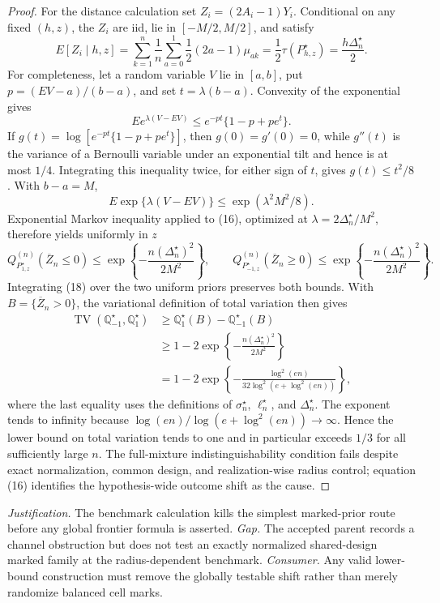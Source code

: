 \documentclass{article}
\begin{document}
\begin{proof}
For the distance calculation set \(Z_i=(2A_i-1)Y_i\).  Conditional on any fixed \((h,z)\), the \(Z_i\) are iid, lie in \([-M/2,M/2]\), and satisfy
\[
 E[Z_i\mid h,z]
 =\sum_{k=1}^n\frac1n\sum_{a=0}^1\frac12(2a-1)\mu_{ak}
 =\frac12\tau(P_{h,z}^\star)
 =\frac{h\Delta_n^\star}{2}. \tag{16}
\]
For completeness, let a random variable \(V\) lie in \([a,b]\), put \(p=(EV-a)/(b-a)\), and set \(t=\lambda(b-a)\).  Convexity of the exponential gives
\[
 E e^{\lambda(V-EV)}
 \leq e^{-pt}\{1-p+pe^t\}.
\]
If \(g(t)=\log[e^{-pt}\{1-p+pe^t\}]\), then \(g(0)=g'(0)=0\), while \(g''(t)\) is the variance of a Bernoulli variable under an exponential tilt and hence is at most \(1/4\).  Integrating this inequality twice, for either sign of \(t\), gives \(g(t)\leq t^2/8\).  With \(b-a=M\),
\[
 E\exp\{\lambda(V-EV)\}\leq\exp(\lambda^2M^2/8). \tag{17}
\]
Exponential Markov inequality applied to (16), optimized at \(\lambda=2\Delta_n^\star/M^2\), therefore yields uniformly in \(z\)
\[
 Q_{P_{1,z}^\star}^{(n)}(\overline Z_n\leq0)
 \leq\exp\left\{-\frac{n(\Delta_n^\star)^2}{2M^2}\right\},
 \qquad
 Q_{P_{-1,z}^\star}^{(n)}(\overline Z_n\geq0)
 \leq\exp\left\{-\frac{n(\Delta_n^\star)^2}{2M^2}\right\}. \tag{18}
\]
Integrating (18) over the two uniform priors preserves both bounds.  With \(B=\{\overline Z_n>0\}\), the variational definition of total variation then gives
\[
 \begin{aligned}
 \operatorname{TV}(\mathbb Q_{-1}^\star,\mathbb Q_1^\star)
 &\geq \mathbb Q_1^\star(B)-\mathbb Q_{-1}^\star(B)\\
 &\geq1-2\exp\left\{-\frac{n(\Delta_n^\star)^2}{2M^2}\right\}\\
 &=1-2\exp\left\{-\frac{\log^2(en)}{32\log^2(e+\log^2(en))}\right\},
 \end{aligned}
\]
where the last equality uses the definitions of \(\sigma_n^\star\), \(\ell_n^\star\), and \(\Delta_n^\star\).  The exponent tends to infinity because \(\log(en)/\log(e+\log^2(en))\to\infty\).  Hence the lower bound on total variation tends to one and in particular exceeds \(1/3\) for all sufficiently large \(n\).  The full-mixture indistinguishability condition fails despite exact normalization, common design, and realization-wise radius control; equation (16) identifies the hypothesis-wide outcome shift as the cause.
\end{proof}
\par\smallskip\noindent \textit{Justification.} The benchmark calculation kills the simplest marked-prior route before any global frontier formula is asserted. \textit{Gap.} The accepted parent records a channel obstruction but does not test an exactly normalized shared-design marked family at the radius-dependent benchmark. \textit{Consumer.} Any valid lower-bound construction must remove the globally testable shift rather than merely randomize balanced cell marks.
\end{document}
